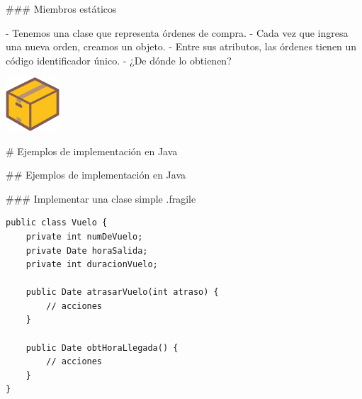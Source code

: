 ### Miembros estáticos


\columnsbegin
{}

- Tenemos una clase que representa órdenes de compra.
    - Cada vez que ingresa una nueva orden, creamos un objeto.
    - Entre sus atributos, las órdenes tienen un código identificador único.
        - ¿De dónde lo obtienen?


\centering\includegraphics[width=20mm]{icons/546-emoji_android_package.png}

\pause

\vspace{3em}


\columnsend

# Ejemplos de implementación en Java

## Ejemplos de implementación en Java

### Implementar una clase simple {.fragile}


\columnsbegin




\vspace{-2em}
\begin{lstlisting}
public class Vuelo {
    private int numDeVuelo;
    private Date horaSalida;
    private int duracionVuelo;

    public Date atrasarVuelo(int atraso) {
        // acciones
    }

    public Date obtHoraLlegada() {
        // acciones
    }
}
\end{lstlisting}

